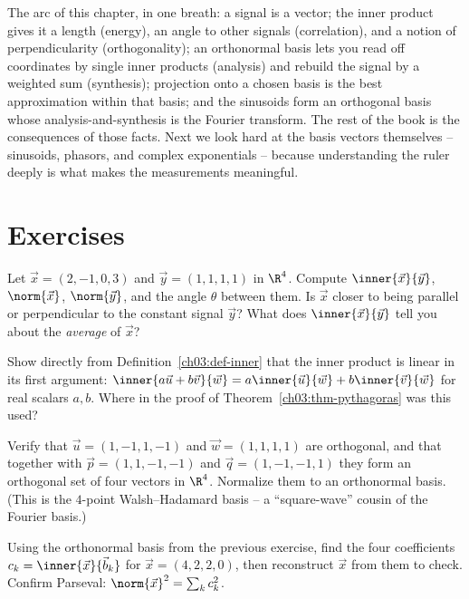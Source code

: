 The arc of this chapter, in one breath: a signal is a vector; the inner product gives it a length
(energy), an angle to other signals (correlation), and a notion of perpendicularity (orthogonality);
an orthonormal basis lets you read off coordinates by single inner products (analysis) and rebuild the
signal by a weighted sum (synthesis); projection onto a chosen basis is the best approximation within
that basis; and the sinusoids form an orthogonal basis whose analysis-and-synthesis is the Fourier
transform. The rest of the book is the consequences of those facts. Next we look hard at the basis
vectors themselves -- sinusoids, phasors, and complex exponentials -- because understanding the ruler
deeply is what makes the measurements meaningful.

\section{Exercises}
\label{ch03:exercises}

\begin{exercise}
Let $\vec{x}=(2,-1,0,3)$ and $\vec{y}=(1,1,1,1)$ in $\R^4$. Compute $\inner{\vec{x}}{\vec{y}}$,
$\norm{\vec{x}}$, $\norm{\vec{y}}$, and the angle $\theta$ between them. Is $\vec{x}$ closer to being
parallel or perpendicular to the constant signal $\vec{y}$? What does $\inner{\vec{x}}{\vec{y}}$ tell
you about the \emph{average} of $\vec{x}$?
\end{exercise}

\begin{exercise}
Show directly from Definition~\ref{ch03:def-inner} that the inner product is linear in its first
argument: $\inner{a\vec{u}+b\vec{v}}{\vec{w}} = a\inner{\vec{u}}{\vec{w}} + b\inner{\vec{v}}{\vec{w}}$
for real scalars $a,b$. Where in the proof of Theorem~\ref{ch03:thm-pythagoras} was this used?
\end{exercise}

\begin{exercise}
Verify that $\vec{u}=(1,-1,1,-1)$ and $\vec{w}=(1,1,1,1)$ are orthogonal, and that together with
$\vec{p}=(1,1,-1,-1)$ and $\vec{q}=(1,-1,-1,1)$ they form an orthogonal set of four vectors in
$\R^4$. Normalize them to an orthonormal basis. (This is the $4$-point Walsh--Hadamard basis -- a
``square-wave'' cousin of the Fourier basis.)
\end{exercise}

\begin{exercise}
Using the orthonormal basis from the previous exercise, find the four coefficients $c_k =
\inner{\vec{x}}{\vec{b}_k}$ for $\vec{x}=(4,2,2,0)$, then reconstruct $\vec{x}$ from them to check.
Confirm Parseval: $\norm{\vec{x}}^2 = \sum_k c_k^2$.
\end{exercise}

